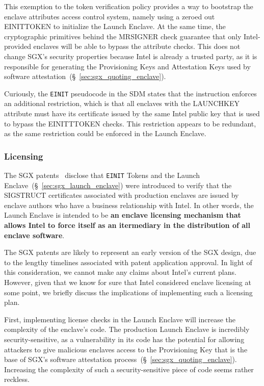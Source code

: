 This exemption to the token verification policy provides a way to bootstrap the
enclave attributes access control system, namely using a zeroed out EINITTOKEN
to initialize the Launch Enclave. At the same time, the cryptographic
primitives behind the MRSIGNER check guarantee that only Intel-provided
enclaves will be able to bypass the attribute checks. This does not change
SGX's security properties because Intel is already a trusted party, as it is
responsible for generating the Provisioning Keys and Attestation Keys used by
software attestation~(\S~\ref{sec:sgx_quoting_enclave}).

Curiously, the \texttt{EINIT} pseudocode in the SDM states that the instruction
enforces an additional restriction, which is that all enclaves with the
LAUNCHKEY attribute must have its certificate issued by the same Intel public
key that is used to bypass the EINITTTOKEN checks. This restriction appears to
be redundant, as the same restriction could be enforced in the Launch Enclave.


\subsubsection{Licensing}
\label{sec:sgx_licensing}

The SGX patents~\cite{intel2013patent1, intel2013patent2} disclose that
\texttt{EINIT} Tokens and the Launch Enclave~(\S~\ref{sec:sgx_launch_enclave})
were introduced to verify that the SIGSTRUCT certificates associated with
production enclaves are issued by enclave authors who have a business
relationship with Intel. In other words, the Launch Enclave is intended to be
\textbf{an enclave licensing mechanism that allows Intel to force itself as an
itermediary in the distribution of all enclave software}.

The SGX patents are likely to represent an early version of the SGX design, due
to the lengthy timelines associated with patent application approval.
In light of this consideration, we cannot make any claims about Intel's current
plans. However, given that we know for sure that Intel considered enclave
licensing at some point, we briefly discuss the implications of implementing
such a licensing plan.

First, implementing license checks in the Launch Enclave will increase the
complexity of the enclave's code. The production Launch Enclave is incredibly
security-sensitive, as a vulnerability in its code has the potential for
allowing attackers to give malicious enclaves access to the Provisioning Key
that is the base of SGX's software attestation
process~(\S~\ref{sec:sgx_quoting_enclave}). Increasing the complexity of such a
security-sensitive piece of code seems rather reckless.

